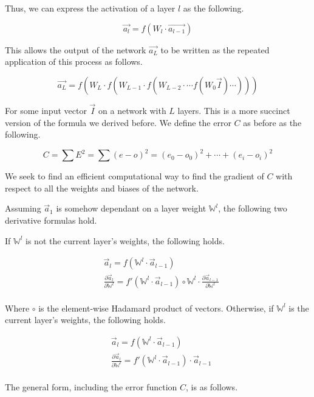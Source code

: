 \documentclass[8pt]{amsart}
\newcommand\mat[1]{\mathbb{#1}}
\begin{document}
Thus, we can express the activation of a layer $l$ as the following.

\[
    \vec{a_l} = f(W_l \cdot \vec{a_{l - 1}})
\]

This allows the output of the network $\vec{a_L}$ to be written as the repeated
application of this process as follows.

\[
    \vec{a_L} = f \left( 
        W_L \cdot f \left(
            W_{L - 1} \cdot f \left( 
                W_{L - 2} \cdot \cdots
                    f \left( W_0 \vec{I}
                \right) \cdots 
            \right)
        \right)
    \right)
\]

For some input vector $\vec{I}$ on a network with $L$ layers. This is a more
succinct version of the formula we derived before. We define the error $C$ as
before as the following.

\[
    C = \sum E^2 = \sum (e - o)^2 = (e_0 - o_0)^2 + \cdots + (e_i - o_i)^2
\]

We seek to find an efficient computational way to find the gradient of $C$ with
respect to all the weights and biases of the network.

Assuming $\vec{a}_1$ is somehow dependant on a layer weight $\mat{W}^l$, the following two
derivative formulas hold.

If $\mat{W}^l$ is not the current layer's weights, the following holds.

\[
    \begin{aligned}
        & \vec{a}_l = f(\mat{W}^l \cdot \vec{a}_{l - 1}) \\
        & \frac{ \partial \vec{a}_l }{ \partial \mat{W}^l } =
            f'(\mat{W}^l \cdot \vec{a}_{l - 1}) \circ \mat{W}^l
            \cdot \frac{ \partial \vec{a}_{l - 1} }{ \partial \mat{W}^l } \\
    \end{aligned}
\]

Where $\circ$ is the element-wise Hadamard product of vectors. Otherwise, if $\mat{W}^l$
is the current layer's weights, the following holds.

\[
    \begin{aligned}
        & \vec{a}_l = f(\mat{W}^l \cdot \vec{a}_{l - 1}) \\
        & \frac{ \partial \vec{a}_l }{ \partial \mat{W}^l } =
            f'(\mat{W}^l \cdot \vec{a}_{l - 1}) \cdot \vec{a}_{l - 1} \\
    \end{aligned}
\]

The general form, including the error function $C$, is as follows.
\end{document}
